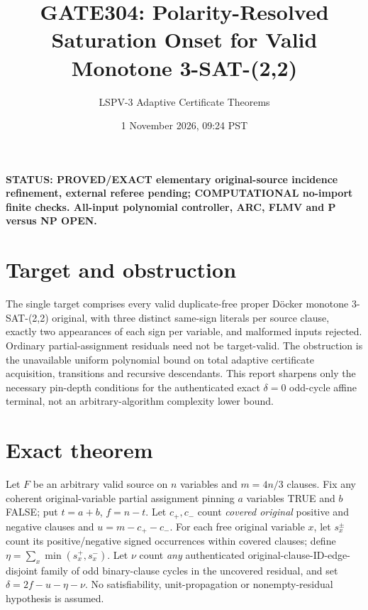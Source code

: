 \documentclass[11pt]{article}
\title{GATE304: Polarity-Resolved Saturation Onset for Valid Monotone 3-SAT-(2,2)}
\author{LSPV-3 Adaptive Certificate Theorems}
\date{1 November 2026, 09:24 PST}
\begin{document}
\maketitle
\noindent\textbf{STATUS: PROVED/EXACT elementary original-source incidence refinement, external referee pending; COMPUTATIONAL no-import finite checks. All-input polynomial controller, ARC, FLMV and P versus NP OPEN.}

\section{Target and obstruction}
The single target comprises every valid duplicate-free proper D\"ocker monotone 3-SAT-(2,2) original, with three distinct same-sign literals per source clause, exactly two appearances of each sign per variable, and malformed inputs rejected. Ordinary partial-assignment residuals need not be target-valid. The obstruction is the unavailable uniform polynomial bound on total adaptive certificate acquisition, transitions and recursive descendants. This report sharpens only the necessary pin-depth conditions for the authenticated exact $\delta=0$ odd-cycle affine terminal, not an arbitrary-algorithm complexity lower bound.

\section{Exact theorem}
Let $F$ be an arbitrary valid source on $n$ variables and $m=4n/3$ clauses. Fix any coherent original-variable partial assignment pinning $a$ variables TRUE and $b$ FALSE; put $t=a+b$, $f=n-t$. Let $c_+,c_-$ count \emph{covered original} positive and negative clauses and $u=m-c_+-c_-$. For each free original variable $x$, let $s_x^\pm$ count its positive/negative signed occurrences within covered clauses; define $\eta=\sum_x\min(s_x^+,s_x^-)$.
Let $\nu$ count \emph{any} authenticated original-clause-ID-edge-disjoint family of odd binary-clause cycles in the uncovered residual, and set $\delta=2f-u-\eta-\nu$. No satisfiability, unit-propagation or nonempty-residual hypothesis is assumed.
\end{document}

